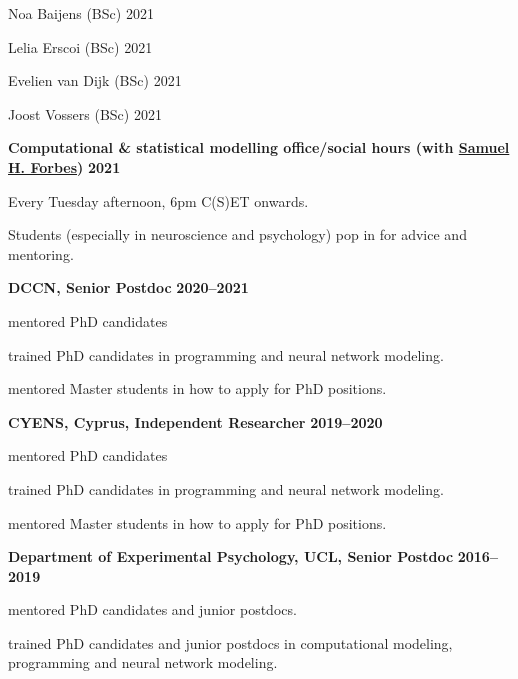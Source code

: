 \documentclass[10pt]{article}
\newenvironment{outerlist}[1][\enskip\textbullet]%
        {\begin{itemize}[#1]}{\end{itemize}%
         \vspace{-.6\baselineskip}}
\newenvironment{innerlist}[1][\enskip\textbullet]%
        {\begin{compactitem}[#1]}{\end{compactitem}}
\begin{document}
\begin{outerlist}
\begin{innerlist}
        \item Noa Baijens (BSc) \hfill 2021
        \item Lelia Erscoi (BSc) \hfill 2021
        \item Evelien van Dijk (BSc) \hfill 2021
        \item Joost Vossers (BSc) \hfill 2021
    \end{innerlist}
    
 
      \item[\textbf{Computational \& statistical modelling office/social hours (with \href{http://samforbes.me/}{Samuel H. Forbes})}] \hfill \textbf{2021}
      \begin{innerlist}
        \item Every Tuesday afternoon, 6pm C(S)ET onwards.
         \item  Students (especially in neuroscience and psychology) pop in for advice and mentoring.

  \end{innerlist}



  \item[\textbf{DCCN, Senior Postdoc}] \hfill \textbf{2020--2021}
      \begin{innerlist}
        \item mentored PhD candidates 
        \item trained PhD candidates in programming and neural network modeling.
         \item  mentored Master students in how to apply for PhD positions.
  \end{innerlist}
  
    \item[\textbf{CYENS, Cyprus, Independent Researcher}] \hfill \textbf{2019--2020}
      \begin{innerlist}
        \item mentored PhD candidates 
        \item trained PhD candidates in programming and neural network modeling.
         \item  mentored Master students in how to apply for PhD positions.
  \end{innerlist}



    \item[\textbf{Department of Experimental Psychology, UCL, Senior Postdoc}] \hfill \textbf{2016--2019}
      \begin{innerlist}
        \item mentored PhD candidates and junior postdocs.
        \item trained PhD candidates and junior postdocs in computational modeling, programming and neural network modeling.
  \end{innerlist}



\end{outerlist}
\end{document}

